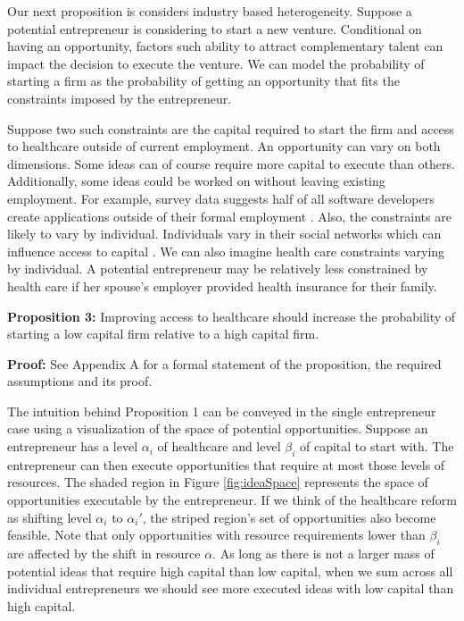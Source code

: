 \documentclass[12pt]{article}
\begin{document}
Our next proposition is considers industry based heterogeneity. Suppose a potential entrepreneur is considering to start a new venture. Conditional on having an opportunity, factors such ability to attract complementary talent \cite{stuartSorensen} can impact the decision to execute the venture. We can model the probability of starting a firm as the probability of getting an opportunity that fits the constraints imposed by the entrepreneur. 

Suppose two such constraints are the capital required to start the firm and access to healthcare  outside of current employment. An opportunity can vary on both dimensions. Some ideas can of course require more capital to execute than others. Additionally, some ideas could be worked on without leaving existing employment. For example, survey data suggests half of all software developers create applications outside of their formal employment \cite{evans}. Also, the constraints are likely to vary by individual. Individuals vary in their social networks which can influence access to capital \cite{uzzi}. We can also imagine health care constraints varying by individual. A potential entrepreneur may be relatively less constrained by health care if her spouse's employer provided health insurance for their family. 

\textbf{Proposition 3:} 
Improving access to healthcare should increase the probability of starting a low capital firm relative to a high capital firm. 

\textbf{Proof:}
See Appendix A for a formal statement of the proposition, the required assumptions and its proof. 

The intuition behind Proposition 1 can be conveyed in the single entrepreneur case using a visualization of the space of potential opportunities. Suppose an entrepreneur has a level $\alpha_i$ of healthcare and level $\beta_i$ of capital to start with. The entrepreneur can then execute opportunities that require at most those levels of resources. The shaded region in Figure \ref{fig:ideaSpace} represents the space of opportunities executable by the entrepreneur. If we think of the healthcare reform as shifting level $\alpha_i$ to $\alpha_i'$, the striped region's set of opportunities also become feasible. Note that only opportunities with resource requirements lower than $\beta_i$ are affected by the shift in resource $\alpha$. As long as there is not a larger mass of potential ideas that require high capital than low capital, when we sum across all individual entrepreneurs we should see more executed ideas with low capital than high capital. 
\end{document}
